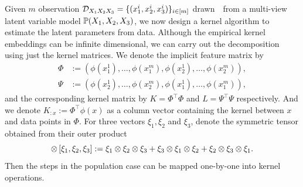 \documentclass{article}
\begin{document}
Given $m$ observation $\mathcal{D}_{X_1 X_2 X_3}=\{(x_1^i,x_2^i,x_3^i)\}_{i \in [m]}$ drawn~\iid~from a multi-view latent variable model $\mathbb{P}(X_1,X_2,X_3)$, we now design a kernel algorithm to estimate the latent parameters from data. Although the empirical kernel embeddings can be infinite dimensional, we can carry out the decomposition using just the kernel matrices.
We  denote the implicit feature matrix by
\begin{align*}
  \Phi &:= (\phi(x_1^1), \ldots, \phi(x_1^m), \phi(x_2^1),  \ldots, \phi(x_2^m)),  \\
  \Psi &:= (\phi(x_2^1), \ldots, \phi(x_2^m), \phi(x_1^1),  \ldots, \phi(x_1^m)),
\end{align*}
and the corresponding kernel matrix by $K = \Phi^\top \Phi$ and $L = \Psi^\top \Psi$ respectively. And we denote $K_{:x}:=\Phi^\top \phi(x)$ as a column vector containing the kernel between $x$ and data points in $\Phi$. For three vectors $\xi_1, \xi_2$ and $\xi_3$, denote the symmetric tensor obtained from their outer product
$$
	\otimes\left[\xi_1,\xi_2,\xi_3\right] := \xi_1\otimes\xi_2\otimes\xi_3 + \xi_3\otimes\xi_1\otimes\xi_2 + \xi_2\otimes\xi_3\otimes\xi_1.
$$
Then the steps in the population case can be mapped one-by-one into kernel operations.
\end{document}

